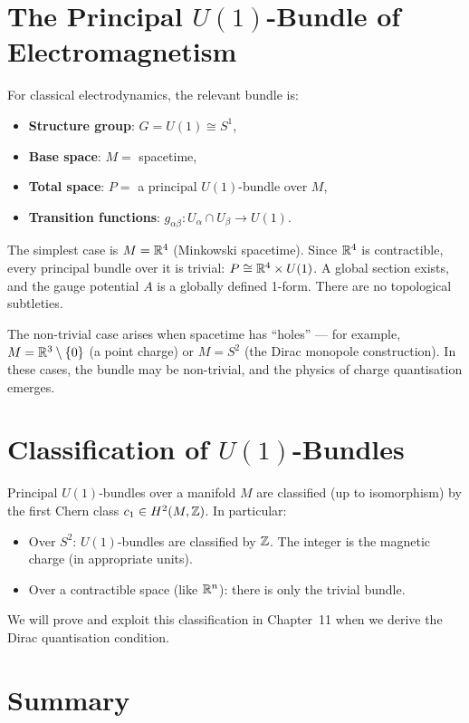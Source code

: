 \section{The Principal $U(1)$-Bundle of Electromagnetism}

For classical electrodynamics, the relevant bundle is:
\begin{itemize}
\item \textbf{Structure group}: $G = U(1) \cong S^1$,
\item \textbf{Base space}: $M = $ spacetime,
\item \textbf{Total space}: $P = $ a principal $U(1)$-bundle over $M$,
\item \textbf{Transition functions}: $g_{\alpha\beta}: U_\alpha \cap U_\beta \to U(1)$.
\end{itemize}

The simplest case is $M = \mathbb{R}^4$ (Minkowski spacetime). Since $\mathbb{R}^4$ is contractible, every principal bundle over it is trivial: $P \cong \mathbb{R}^4 \times U(1)$. A global section exists, and the gauge potential $A$ is a globally defined 1-form. There are no topological subtleties.

The non-trivial case arises when spacetime has ``holes'' --- for example, $M = \mathbb{R}^3 \setminus \{0\}$ (a point charge) or $M = S^2$ (the Dirac monopole construction). In these cases, the bundle may be non-trivial, and the physics of charge quantisation emerges.

\section{Classification of $U(1)$-Bundles}

\begin{theorem}
Principal $U(1)$-bundles over a manifold $M$ are classified (up to isomorphism) by the first Chern class $c_1 \in H^2(M, \mathbb{Z})$. In particular:
\begin{itemize}
\item Over $S^2$: $U(1)$-bundles are classified by $\mathbb{Z}$. The integer is the magnetic charge (in appropriate units).
\item Over a contractible space (like $\mathbb{R}^n$): there is only the trivial bundle.
\end{itemize}
\end{theorem}

We will prove and exploit this classification in Chapter~11 when we derive the Dirac quantisation condition.

\section{Summary}

